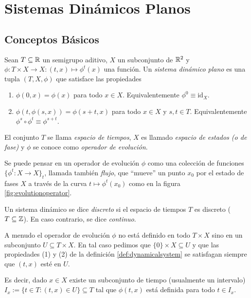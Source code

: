 \chapter{Sistemas Dinámicos Planos}
\label{cap:sistemasplanosautonomos}

\section{Conceptos Básicos} \label{sec:conceptosbasicos}

\begin{definition} \label{def:dynamicalsystem}
Sean $T \subseteq {\ensuremath{\mathbb{R}}}$ un semigrupo aditivo, $X$ un subconjunto de ${\mathbb{R}}^2$ y $\phi: T \times X \to X: (t,x) \mapsto \phi^t(x)$ una función. Un \emph{sistema dinámico plano} es una tupla $(T, X, \phi)$ que satisface las propiedades

\begin{enumerate}[(1)]
    \item $\phi \left( 0, x \right) = \phi \left( x \right)$ para todo $x \in
    X$. Equivalentemente $\phi^0 \equiv \text{id}_X$.
    
    \item $\phi \left( t, \phi \left( s, x \right) \right) = \phi \left(
    s + t, x \right)$ para todo $x \in X$ y $s, t \in T$. Equivalentemente $\phi^{s} \circ \phi^{t} \equiv \phi^{s + t}$.
\end{enumerate}

El conjunto $T$ se llama \emph{espacio de tiempos}, $X$ es llamado {\emph{espacio de estados (o de fase)}} y $\phi$ se conoce como {\emph{operador de evoluci\'on}}.
\end{definition}

Se puede pensar en un operador de evolución $\phi$ como una colección de funciones $\{ \phi^t: X \to X \}_t$, llamada también \emph{flujo}, que ``mueve'' un punto $x_0$ por el estado de fases $X$ a través de la curva $t \mapsto \phi^t(x_0)$ como en la figura \ref{fig:evolutionoperator}.

\begin{remark}
Un sistema dinámico se dice \emph{discreto} si el espacio de tiempos $T$ es discreto ($T \subseteq {\ensuremath{\mathbb{Z}}}$). En caso contrario, se dice \emph{continuo}.
\end{remark}

\begin{remark}
A menudo el operador de evolución $\phi$ no está definido en todo $T \times X$ sino en un subconjunto $U \subseteq T \times X$. En tal caso pedimos que $\{ 0 \} \times X \subseteq U$ y que las propiedades (1) y (2) de la definición \ref{def:dynamicalsystem} se satisfagan siempre que $(t, x)$ esté en $U$.

Es decir, dado $x \in X$ existe un subconjunto de tiempo (usualmente un intervalo) $I_x := \{ t \in T : (t,x) \in U \} \subseteq T$ tal que $\phi(t,x)$ está definida para todo $t \in I_x$.
\end{remark}

